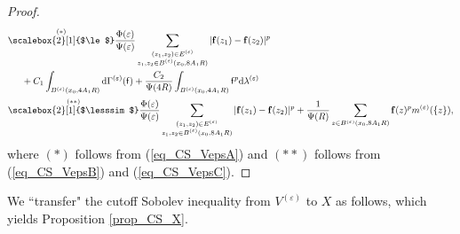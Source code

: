 \documentclass[11pt,a4paper]{article}
\numberwithin{equation}{section}
\theoremstyle{plain}
\theoremstyle{definition}
\begin{document}
\begin{proof}
\begin{align*}
&\overset{(*)}{\scalebox{2}[1]{$\le$}}\frac{\Phi(\varepsilon)}{\Psi(\varepsilon)}\sum_{\substack{(z_1,z_2)\in E^{(\varepsilon)}\\z_1,z_2\in B^{(\varepsilon)}(x_0,8A_1R)}}|\mathbf{f}(z_1)-\mathbf{f}(z_2)|^p\\
&\hspace{15pt}+C_{1}\int_{B^{(\varepsilon)}(x_0,4A_1R)}\mathrm{d}\Gamma^{(\varepsilon)}(\mathsf{f})+\frac{C_{2}}{\Psi(4R)}\int_{B^{(\varepsilon)}(x_0,4A_1R)}\mathsf{f}^p\mathrm{d} \lambda^{(\varepsilon)}\\
&\overset{(**)}{\scalebox{2}[1]{$\lesssim$}}\frac{\Phi(\varepsilon)}{\Psi(\varepsilon)}\sum_{\substack{(z_1,z_2)\in E^{(\varepsilon)}\\z_1,z_2\in B^{(\varepsilon)}(x_0,8A_1R)}}|\mathbf{f}(z_1)-\mathbf{f}(z_2)|^p+\frac{1}{\Psi(R)}\sum_{z\in B^{(\varepsilon)}(x_0,8A_1R)}\mathbf{f}(z)^pm^{(\varepsilon)}(\{z\}),
\end{align*}
where $(*)$ follows from (\ref{eq_CS_VepsA}) and $(**)$ follows from (\ref{eq_CS_VepsB}) and (\ref{eq_CS_VepsC}).
\end{proof}

We ``transfer" the cutoff Sobolev inequality from $V^{(\varepsilon)}$ to $X$ as follows, which yields Proposition \ref{prop_CS_X}.
\end{document}
